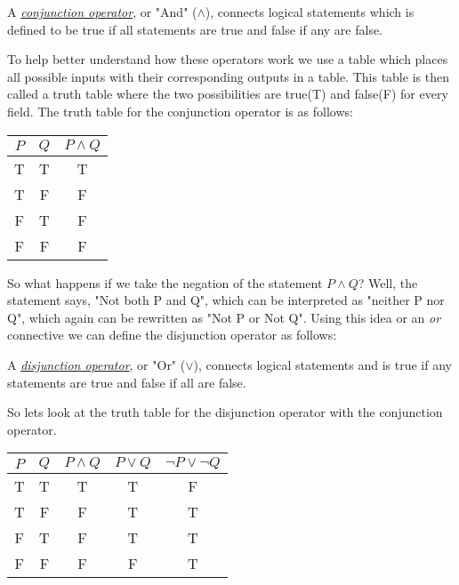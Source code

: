 \begin{defn}
	A \underline{\emph{conjunction operator}}, or "And" ($\land$), connects logical statements which is defined to be true if all statements are true and false if any are false.
\end{defn}

To help better understand how these operators work we use a table which places all possible inputs with their corresponding outputs in a table.
This table is then called a truth table where the two possibilities are true(T) and false(F) for every field.
The truth table for the conjunction operator is as follows:

\begin{center}
	\begin{tabular}{cc|c}
		$P$ & $Q$ & $P \land Q$ \\
		\hline
		T & T & T \\
		T & F & F \\
		F & T & F \\
		F & F & F \\
	\end{tabular}
\end{center}

So what happens if we take the negation of the statement $P \land Q$?
Well, the statement says, "Not both P and Q", which can be interpreted as "neither P nor Q", which again can be rewritten as "Not P or Not Q".
Using this idea or an \emph{or} connective we can define the disjunction operator as follows:

\begin{defn}
	A \underline{\emph{disjunction operator}}, or "Or" ($\lor$), connects logical statements and is true if any statements are true and false if all are false.
\end{defn}

So lets look at the truth table for the disjunction operator with the conjunction operator.

\begin{center}
	\begin{tabular}{cc|ccc}
		$P$ & $Q$ & $P \land Q$ & $P \lor Q$ & $\neg P \lor \neg Q$ \\
		\hline
		T & T & T & T & F \\
		T & F & F & T & T \\
		F & T & F & T & T \\
		F & F & F & F & T \\
	\end{tabular}
\end{center}

